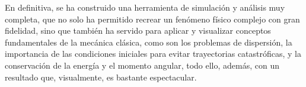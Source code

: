 En definitiva, se ha construido una herramienta de simulación y análisis muy completa, que no solo ha 
permitido recrear un fenómeno físico complejo con gran fidelidad, sino que también ha servido para aplicar 
y visualizar conceptos fundamentales de la mecánica clásica, como son los problemas de dispersión, la importancia de las condiciones iniciales para evitar trayectorias catastróficas, y la 
conservación de la energía y el momento angular, todo ello, además, con un resultado que, visualmente, es 
bastante espectacular.